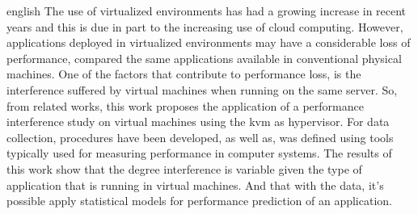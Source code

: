 \begin{resumo}[Abstract]
 \begin{otherlanguage*}{english}
The use of virtualized environments has had a growing increase in recent years and this is due in part to the increasing use of cloud computing. However, applications deployed in virtualized environments may have a considerable loss of performance, compared the same applications available in conventional physical machines. One of the factors that contribute to performance loss, is the interference suffered by virtual machines when running on the same server. So, from related works, this work proposes the application of a performance interference study on virtual machines using the kvm as hypervisor. For data collection, procedures have been developed, as well as, was defined using tools typically used for measuring performance in computer systems. The results of this work show that the degree interference is variable given the type of application that is running in virtual machines. And that with the data, it's possible apply statistical models for performance prediction of an application. %







\end{otherlanguage*}
\end{resumo}
